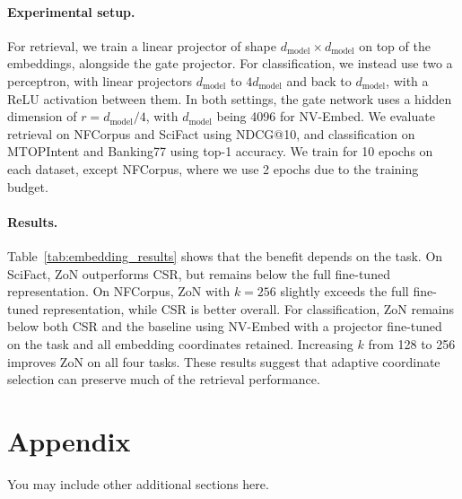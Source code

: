 \documentclass{article} %
\begin{document}
\paragraph{Experimental setup.}
For retrieval, we train a linear projector of shape
$d_{\text{model}}\times d_{\text{model}}$ on top of the embeddings, alongside
the gate projector. For classification, we instead use two a perceptron,
with linear projectors $d_{\text{model}}$ to $4d_{\text{model}}$ and back to $d_{\text{model}}$,
with a ReLU activation between them. In both settings, the gate network uses
a hidden dimension of $r=d_{\text{model}} / 4$, with $d_{\text{model}}$ being
4096 for NV-Embed.
We evaluate retrieval on NFCorpus and SciFact using NDCG@10, and classification
on MTOPIntent and Banking77 using top-1 accuracy. We train for 10 epochs on
each dataset, except NFCorpus, where we use 2 epochs due to the training budget.



\paragraph{Results.}
Table~\ref{tab:embedding_results} shows that the benefit depends on the task.
On SciFact, ZoN outperforms CSR, but remains below the full
fine-tuned representation. On NFCorpus, ZoN with $k=256$ slightly exceeds
the full fine-tuned representation, while CSR is better overall.
For classification, ZoN remains below both CSR and the baseline using NV-Embed
with a projector fine-tuned on the task and all embedding coordinates retained.
Increasing $k$ from 128 to 256 improves ZoN on all four tasks.
These results suggest that adaptive coordinate selection can preserve much
of the retrieval performance.




\appendix

\section{Appendix}
You may include other additional sections here.
\end{document}
